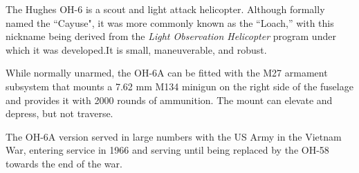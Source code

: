 

The Hughes OH-6 is a scout and light attack helicopter. Although formally named the “Cayuse", it was more commonly known as the “Loach,” with this nickname being derived from the {\itshape Light Observation Helicopter} program under which it was developed.It is small, maneuverable, and robust.

While normally unarmed, the OH-6A can be fitted with the M27 armament subsystem that mounts a 7.62 mm M134 minigun on the right side of the fuselage and provides it with 2000 rounds of ammunition. The mount can elevate and depress, but not traverse.

The OH-6A version served in large numbers with the US Army in the Vietnam War, entering service in 1966 and serving until being replaced by the OH-58 towards the end of the war.
